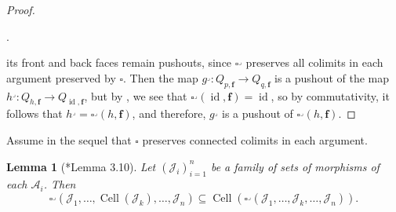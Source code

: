 \documentclass[leqno]{article}
\numberwithin{equation}{subsection}
\theoremstyle{plain}   %
\newtheorem{lemma}[equation]{Lemma}
\theoremstyle{remark}
\theoremstyle{plain}
\DeclareMathOperator{\id}{id}
\begin{document}
\begin{proof}
\begin{center}
.
	\end{center}	
	its front and back faces remain pushouts, since \(\square^\lrcorner\) preserves all colimits in each argument preserved by \(\square\).  Then the map \(g^\lrcorner: Q_{p,\mathbf{f}} \to Q_{q,\mathbf{f}}\)  is a pushout of the map \(h^\lrcorner:Q_{h,\mathbf{f}} \to Q_{\id,\mathbf{f}}\), but by , we see that \(\square^\lrcorner(\id,\mathbf{f})=\id\), so by commutativity, it follows that \(h^\lrcorner = \square^\lrcorner(h,\mathbf{f})\), and therefore, \(g^\lrcorner\) is a pushout of \(\square^\lrcorner(h,\mathbf{f})\).  
\end{proof}
Assume in the sequel that \(\square\) preserves connected colimits in each argument.
\begin{lemma}[\cite{oury}*{Lemma 3.10}]\label{cornertensorcell}
	Let \((\mathscr{J}_i)_{i=1}^n\) be a family of sets of morphisms of each \(\mathcal{A}_i\). Then 
	\[\square^\lrcorner(\mathscr{J}_1,\dots,\operatorname{Cell}(\mathscr{J}_k),\dots,\mathscr{J}_n) \subseteq \operatorname{Cell}(\square^\lrcorner(\mathscr{J}_1,\dots,\mathscr{J}_k,\dots,\mathscr{J}_n)).\]
\end{lemma}
\end{document}
